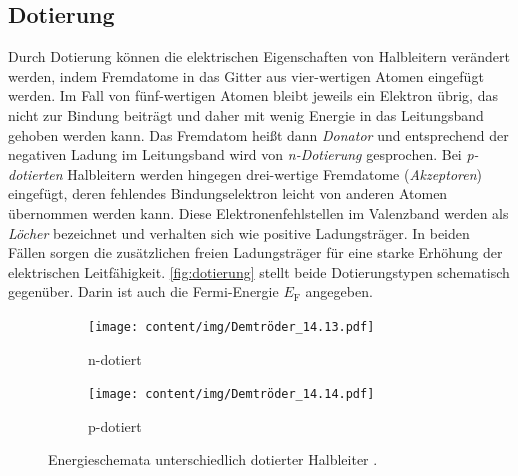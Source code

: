 \subsection{Dotierung}
Durch Dotierung können die elektrischen Eigenschaften von Halbleitern verändert werden,
indem Fremdatome in das Gitter aus vier-wertigen Atomen eingefügt werden.
Im Fall von fünf-wertigen Atomen %
bleibt jeweils ein Elektron übrig,
das nicht zur Bindung beiträgt und daher mit wenig Energie in das Leitungsband gehoben werden kann.
Das Fremdatom heißt dann \emph{Donator} und entsprechend der negativen Ladung im Leitungsband wird von \emph{n-Dotierung} gesprochen.
%
Bei \emph{p-dotierten} Halbleitern werden hingegen drei-wertige Fremdatome (\emph{Akzeptoren}) eingefügt,
deren fehlendes Bindungselektron leicht von anderen Atomen übernommen werden kann.
Diese Elektronenfehlstellen im Valenzband werden als \emph{Löcher} bezeichnet und verhalten sich wie positive Ladungsträger.
%
In beiden Fällen sorgen die zusätzlichen freien Ladungsträger für eine starke Erhöhung der elektrischen Leitfähigkeit.
\autoref{fig:dotierung} stellt beide Dotierungstypen schematisch gegenüber.
Darin ist auch die Fermi-Energie $E_\text{F}$ angegeben.

\begin{figure}
    \centering
    \begin{subfigure}{0.48\textwidth}
        \centering
        \texttt{[image: content/img/Demtröder\_14.13.pdf]}
        \caption{n-dotiert}
        \label{fig:dotierung:donatoren}
    \end{subfigure}
    \hfill
    \begin{subfigure}{0.48\textwidth}
        \centering
        \texttt{[image: content/img/Demtröder\_14.14.pdf]}
        \caption{p-dotiert}
        \label{fig:dotierung:akzeptoren}
    \end{subfigure}
    \caption{Energieschemata unterschiedlich dotierter Halbleiter \cite{demtroeder}.}
    \label{fig:dotierung}
\end{figure}


